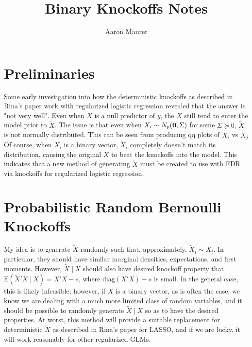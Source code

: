 \documentclass[11pt]{article}
\newcommand{\E}{\mathrm{E}}
\newcommand{\diag}{\mathrm{diag}}
\newcommand{\st}{ \; \big | \:}
\theoremstyle{definition}
\begin{document}
\title{Binary Knockoffs Notes}
\author{Aaron Maurer}
\maketitle
\section{Preliminaries} 
Some early investigation into how the deterministic knockoffs as described in Rina's paper work with regularized logistic regression revealed that the answer is "not very well". Even when $X$ is a null predictor of $y$, the $X$ still tend to enter the model prior to $\tilde X$. The issue is that even when $X_i\sim N_p({\bf 0}, \Sigma)$ for some $\Sigma\succeq 0$, $\tilde X$ is not normally distributed. This can be seen from producing qq plots of $X_i$ vs $\tilde X_j$Of course, when $X_i$ is a binary vector, $\tilde X_i$ completely doesn't match its distribution, causing the original $X$ to beat the knockoffs into the model. This indicates that a new method of generating $\tilde X$ must be created to use with FDR via knockoffs for regularized logistic regression.

\section{Probabilistic Random Bernoulli Knockoffs}
My idea is to generate $\tilde X$ randomly such that, approximately, $\tilde X_i\sim X_i$. In particular, they should have similar marginal densities, expectations, and first moments. However, $\tilde X\st X$ should also have desired knockoff property that $\E(\tilde X'X\st X) = X'X-s$, where $\diag(X'X)-s$ is small. In the general case, this is likely infeasible; however, if $X$ is a binary vector, as is often the case, we know we are dealing with a much more limited class of random variables, and it should be possible to randomly generate $\tilde X\st X$ so as to have the desired properties. At worst, this method will provide a suitable replacement for deterministic $\tilde X$ as described in Rina's paper for LASSO, and if we are lucky, it will work reasonably for other regularized GLMs. 
\end{document}
